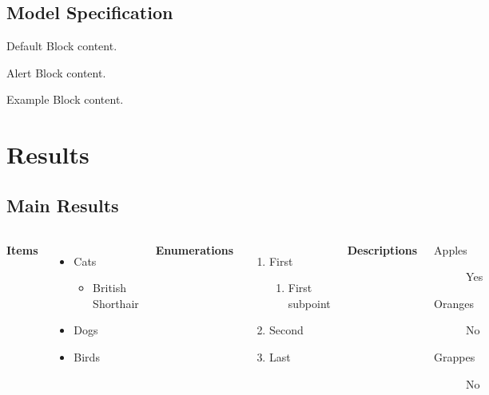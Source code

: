 \documentclass[
10pt,notheorems,compress,hyperref={pdfauthor=Maghfira Ramadhani}
]{beamer}
\begin{document}
\subsection{Model Specification}
\begin{frame}

   \centering
	\begin{minipage}[b]{0.5\textwidth}

	  \begin{block}{Default}
        Block content.
      \end{block}

      \begin{alertblock}{Alert}
        Block content.
      \end{alertblock}

      \begin{exampleblock}{Example}
        Block content.
      \end{exampleblock}      
      
	\end{minipage}	
\end{frame}

\section{Results}
\subsection{Main Results}
\begin{frame}
    \begin{columns}[T,onlytextwidth]
      \textbf{Items}
      \begin{itemize}
        \item Cats 
        \begin{itemize}
            \item British Shorthair
        \end{itemize}
        \item Dogs \item Birds
      \end{itemize}

      \textbf{Enumerations}
      \begin{enumerate}
        \item First 
        \begin{enumerate}
            \item First subpoint
        \end{enumerate}
        \item Second \item Last
      \end{enumerate}

      \textbf{Descriptions}
      \begin{description}
        \item[Apples] Yes \item[Oranges] No \item[Grappes] No
      \end{description}
\end{columns}
\end{frame}
\end{document}
